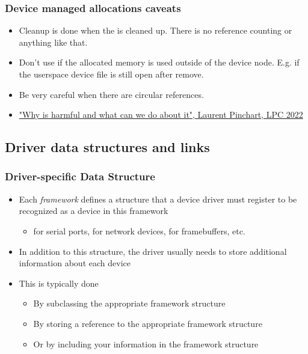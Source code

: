 \begin{frame}
  \frametitle{Device managed allocations caveats}
  \begin{itemize}
  \item Cleanup is done when the  is cleaned up.
    There is no reference counting or anything like that.
  \item Don't use if the allocated memory is used outside of the device
    node. E.g. if the userspace device file is still open after remove.
  \item Be very careful when there are circular references.
  \item \href{https://lpc.events/event/16/contributions/1227/}{"Why is
     harmful and what can we do about it",
    Laurent Pinchart, LPC 2022}
  \end{itemize}
\end{frame}


\subsection{Driver data structures and links}

\begin{frame}
  \frametitle{Driver-specific Data Structure}
  \begin{itemize}
  \item Each \emph{framework} defines a structure that a device driver
    must register to be recognized as a device in this framework
    \begin{itemize}
    \item {} for serial ports,  for network
      devices,  for framebuffers, etc.
    \end{itemize}
  \item In addition to this structure, the driver usually needs to
    store additional information about each device
  \item This is typically done
    \begin{itemize}
    \item By subclassing the appropriate framework structure
    \item By storing a reference to the appropriate framework
      structure
    \item Or by including your information in the framework structure
    \end{itemize}
  \end{itemize}
\end{frame}

